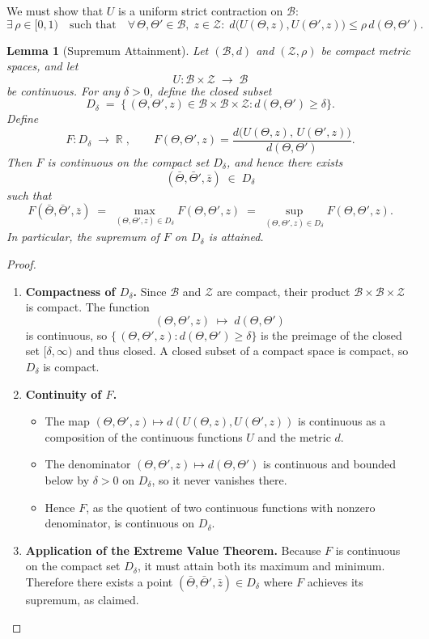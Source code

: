 \documentclass[12pt]{article}
\theoremstyle{definition}
\theoremstyle{plain}
\newtheorem{lemma}{Lemma}[section]
\begin{document}
We must show that \(U\) is a uniform strict contraction on \(\mathcal B\):
\[
  \exists\,\rho\in[0,1)\quad
  \text{such that}\quad
  \forall\,\Theta,\Theta'\in\mathcal B,\;z\in\mathcal Z:\;
  d\bigl(U(\Theta,z),U(\Theta',z)\bigr)\le\rho\,d(\Theta,\Theta').
\]

\begin{lemma}[Supremum Attainment]\label{lem:sup-attained}
Let \((\mathcal B,d)\) and \((\mathcal Z,\rho)\) be compact metric spaces, and let
\[
U:\mathcal B\times\mathcal Z\;\longrightarrow\;\mathcal B
\]
be continuous.  For any \(\delta>0\), define the closed subset
\[
D_\delta \;=\; \{\,(\Theta,\Theta',z)\in\mathcal B\times\mathcal B\times\mathcal Z : 
   d(\Theta,\Theta')\ge\delta\}.
\]
Define
\[
F:D_\delta\;\longrightarrow\;\mathbb R
\;, \qquad
F(\Theta,\Theta',z)
=\frac{d\bigl(U(\Theta,z),\,U(\Theta',z)\bigr)}{d(\Theta,\Theta')}.
\]
Then \(F\) is continuous on the compact set \(D_\delta\), and hence there exists
\[
(\bar\Theta,\bar\Theta',\bar z)\;\in\;D_\delta
\]
such that
\[
F(\bar\Theta,\bar\Theta',\bar z)
\;=\;\max_{(\Theta,\Theta',z)\in D_\delta}F(\Theta,\Theta',z)
\;=\;\sup_{(\Theta,\Theta',z)\in D_\delta}F(\Theta,\Theta',z).
\]
In particular, the supremum of \(F\) on \(D_\delta\) is attained.
\end{lemma}

\begin{proof}
\begin{enumerate}
    \item \textbf{Compactness of \(D_\delta\).}  
   Since \(\mathcal B\) and \(\mathcal Z\) are compact, their product 
   \(\mathcal B\times\mathcal B\times\mathcal Z\) is compact.  The function
   \[
     (\Theta,\Theta',z)\;\longmapsto\;d(\Theta,\Theta')
   \]
   is continuous, so
   \(\{\,( \Theta,\Theta',z ) : d(\Theta,\Theta')\ge\delta\}\)
   is the preimage of the closed set \([\delta,\infty)\) and thus closed.  A closed subset of a compact space is compact, so \(D_\delta\) is compact.

\item \textbf{Continuity of \(F\).}  
\begin{itemize}
    \item The map \((\Theta,\Theta',z)\mapsto d(U(\Theta,z),U(\Theta',z))\) is continuous as a composition of the continuous functions \(U\) and the metric \(d\).  
   \item The denominator \((\Theta,\Theta',z)\mapsto d(\Theta,\Theta')\) is continuous and bounded below by \(\delta>0\) on \(D_\delta\), so it never vanishes there.  
   \item Hence \(F\), as the quotient of two continuous functions with nonzero denominator, is continuous on \(D_\delta\).
\end{itemize}
\item \textbf{Application of the Extreme Value Theorem.}  
   Because \(F\) is continuous on the compact set \(D_\delta\), it must attain both its maximum and minimum.  Therefore there exists a point 
   \((\bar\Theta,\bar\Theta',\bar z)\in D_\delta\) where \(F\) achieves its supremum, as claimed.
\end{enumerate}
\end{proof}
\end{document}
